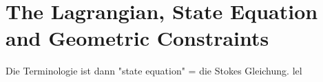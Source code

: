 \section{The Lagrangian, State Equation and Geometric Constraints}
Die Terminologie ist dann "state equation" = die Stokes Gleichung.  lel